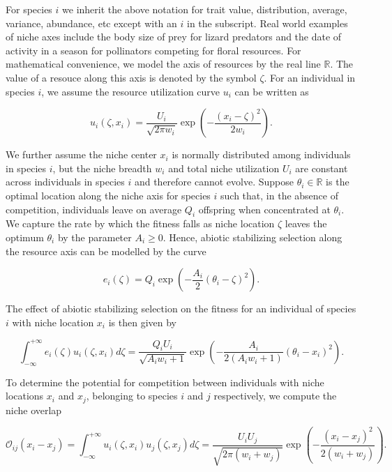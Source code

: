 \documentclass[]{article}
\begin{document}
For species \(i\) we inherit the above notation for trait value,
distribution, average, variance, abundance, etc except with an \(i\) in
the subscript. Real world examples of niche axes include the body size
of prey for lizard predators and the date of activity in a season for
pollinators competing for floral resources. For mathematical
convenience, we model the axis of resources by the real line
\(\mathbb{R}\). The value of a resouce along this axis is denoted by the
symbol \(\zeta\). For an individual in species \(i\), we assume the
resource utilization curve \(u_i\) can be written as

\begin{equation}
u_i(\zeta,x_i)=\frac{U_i}{\sqrt{2\pi w_i}}\exp\left(-\frac{(x_i-\zeta)^2}{2w_i}\right).
\end{equation}

We further assume the niche center \(x_i\) is normally distributed among
individuals in species \(i\), but the niche breadth \(w_i\) and total
niche utilization \(U_i\) are constant across individuals in species
\(i\) and therefore cannot evolve. Suppose \(\theta_i\in\mathbb R\) is
the optimal location along the niche axis for species \(i\) such that,
in the absence of competition, individuals leave on average \(Q_i\)
offspring when concentrated at \(\theta_i\). We capture the rate by
which the fitness falls as niche location \(\zeta\) leaves the optimum
\(\theta_i\) by the parameter \(A_i\geq0\). Hence, abiotic stabilizing
selection along the resource axis can be modelled by the curve

\begin{equation}
e_i(\zeta)=Q_i\exp\left(-\frac{A_i}{2}(\theta_i-\zeta)^2\right).
\end{equation}

The effect of abiotic stabilizing selection on the fitness for an
individual of species \(i\) with niche location \(x_i\) is then given by

\begin{equation}
\int_{-\infty}^{+\infty}e_i(\zeta)u_i(\zeta,x_i)d\zeta=\frac{Q_iU_i}{\sqrt{A_iw_i+1}}\exp\left(-\frac{A_i}{2(A_iw_i+1)}(\theta_i-x_i)^2\right).
\end{equation}

To determine the potential for competition between individuals with
niche locations \(x_i\) and \(x_j\), belonging to species \(i\) and
\(j\) respectively, we compute the niche overlap

\begin{equation}
\mathcal O_{ij}(x_i-x_j)=\int_{-\infty}^{+\infty}u_i(\zeta,x_i)u_j(\zeta,x_j)d\zeta=\frac{U_iU_j}{\sqrt{2\pi(w_i+w_j)}}\exp\left(-\frac{(x_i-x_j)^2}{2(w_i+w_j)}\right).
\end{equation}
\end{document}
